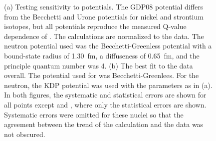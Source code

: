 \begin{figure}[!htbp]
\centering
{}
\caption[Sensitivity of trends in zero-degree cross sections to  optical model parameters.]{(a) Testing sensitivity to  potentials.  The GDP08 potential differs from the Becchetti and Urone potentials for nickel and strontium isotopes, but all potentials reproduce the measured Q-value dependence of \GeTargets.  The calculations are normalized to the  data.  The neutron potential used was the Becchetti-Greenless potential with a bound-state radius of 1.30~fm, a diffuseness of 0.65~fm, and the principle quantum number was 4.  (b) The best fit to the data overall.  The potential used for  was Becchetti-Greenlees.  For the neutron, the KDP potential was used with the parameters as in (a).  In both figures, the systematic and statistical errors are shown for all points except  and , where only the statistical errors are shown.  Systematic errors were omitted for these nuclei so that the agreement between the trend of the calculation and the data was not obscured.}
\label{fig:parameterSensitivity}
\end{figure}

